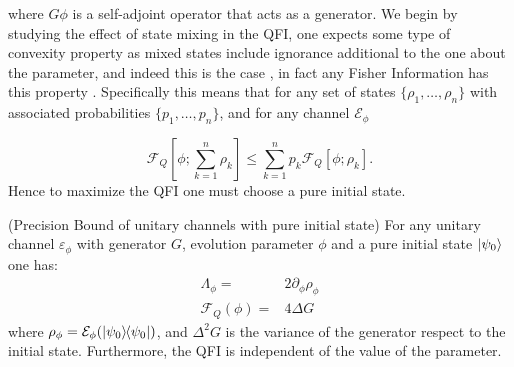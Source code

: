 where $G\phi$ is a self-adjoint operator that acts as a generator. We begin by studying the effect of state mixing in the QFI, one
expects some type of convexity property as mixed states include ignorance additional to the one about the parameter, and indeed this is the case \cite{yu2013quantum}, in fact any Fisher Information has this property \cite{cohen1968fisher}. Specifically
this means that for any set of states $\{\rho_1, \dots, \rho_n\}$
with associated probabilities $\{p_1,\dots, p_n\}$, and for any channel $\mathcal{E}_{\phi}$

\begin{equation}
  \mathcal{F}_{Q}[\phi; \sum_{k=1}^{n}\rho_{k}] \leq \sum_{k=1}^{n}p_{k}\mathcal{F}_{Q}[\phi; \rho_{k}].
\end{equation}
Hence to maximize the QFI one must choose a pure initial state.

\begin{theorem}{(Precision Bound of unitary channels with pure initial state)}
  For any unitary channel $\varepsilon_{\phi}$ with generator $G$, evolution parameter $\phi$ and a pure initial state $\ket{\psi_{0}}$ one has:
  \begin{align}
    \Lambda_{\phi} =& 2 \partial_{\phi}\rho_{\phi}\\
    \mathcal{F}_{Q}(\phi) =& 4 \Delta G
  \end{align}
  where $\rho_{\phi}=\mathcal{E}_{\phi}(\ketbra{\psi_{0}})$, and $\Delta^2G$ is the variance of the generator respect to the
  initial state. Furthermore, the QFI is independent of the value
  of the parameter.
\end{theorem}


